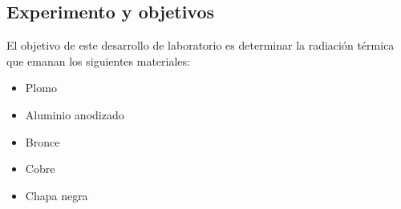 \documentclass[a4paper]{article}
\begin{document}
    \subsection{Experimento y objetivos}
        El objetivo de este desarrollo de laboratorio es determinar la radiación térmica que emanan los siguientes materiales:
        \begin{itemize}
            \setlength{\itemsep}{0pt}
            \item Plomo 
            \item Aluminio anodizado
            \item Bronce
            \item Cobre 
            \item Chapa negra
        \end{itemize}
\end{document}
